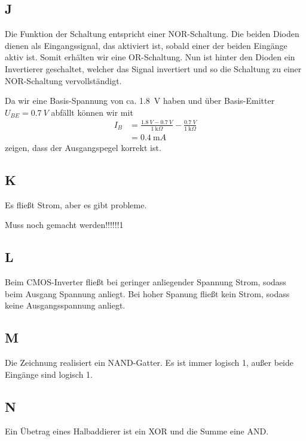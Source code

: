 \documentclass[10pt]{article}
\begin{document}
\begin{multicols}{2}
	\subsection*{J}
	Die Funktion der Schaltung entspricht einer NOR-Schaltung. Die beiden Dioden dienen als Eingangssignal, das aktiviert ist, sobald einer der beiden Eingänge aktiv ist. Somit erhälten wir eine OR-Schaltung. Nun ist hinter den Dioden ein Invertierer geschaltet, welcher das Signal invertiert und so die Schaltung zu einer NOR-Schaltung vervollständigt.

	Da wir eine Basis-Spannung von ca. \SI{1.8}{V} haben und über Basis-Emitter $U_{BE}=\SI{0.7}{V}$ abfällt können wir mit
	\begin{align}
		I_B & =\frac{\SI{1.8}{V}-\SI{0.7}{V}}{\SI{1}{\kilo\Omega}}-\frac{\SI{0.7}{V}}{\SI{1}{\kilo\Omega}} \\
		    & =\SI{0.4}{\milli A}
	\end{align}
	zeigen, dass der Ausgangspegel korrekt ist.
	\subsection*{K}
	Es fließt Strom, aber es gibt probleme.

	Muss noch gemacht werden!!!!!!1
	\subsection*{L}
	Beim CMOS-Inverter fließt bei geringer anliegender Spannung Strom, sodass beim Ausgang Spannung anliegt. Bei hoher Spanung fließt kein Strom, sodass keine Ausgangsspannung anliegt.
	\subsection*{M}
	Die Zeichnung realisiert ein NAND-Gatter. Es ist immer logisch 1, außer beide Eingänge sind logisch 1.
	\subsection*{N}
	Ein Übetrag eines Halbaddierer ist ein XOR und die Summe eine AND.

\end{multicols}
\end{document}
